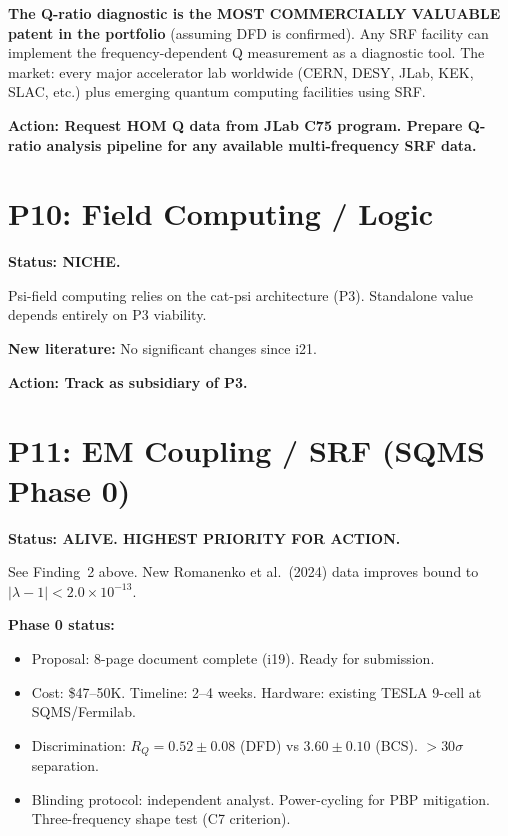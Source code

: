 \documentclass[11pt]{article}
\newcommand{\ee}[1]{\times 10^{#1}}
\begin{document}
\textbf{The Q-ratio diagnostic is the MOST COMMERCIALLY VALUABLE patent
in the portfolio} (assuming DFD is confirmed).  Any SRF facility can
implement the frequency-dependent Q measurement as a diagnostic tool.
The market: every major accelerator lab worldwide (CERN, DESY, JLab,
KEK, SLAC, etc.) plus emerging quantum computing facilities using SRF.

\textbf{Action: Request HOM Q data from JLab C75 program.  Prepare
  Q-ratio analysis pipeline for any available multi-frequency SRF data.}


\section{P10: Field Computing / Logic}

\textbf{Status: NICHE.}

Psi-field computing relies on the cat-psi architecture (P3).
Standalone value depends entirely on P3 viability.

\textbf{New literature:}  No significant changes since i21.

\textbf{Action: Track as subsidiary of P3.}


\section{P11: EM Coupling / SRF (SQMS Phase 0)}

\textbf{Status: ALIVE.  HIGHEST PRIORITY FOR ACTION.}

See Finding~2 above.  New Romanenko et al.\ (2024) data improves bound
to $|\lambda-1| < 2.0\ee{-13}$.

\textbf{Phase 0 status:}
\begin{itemize}
\item Proposal: 8-page document complete (i19).  Ready for submission.
\item Cost: \$47--50K.  Timeline: 2--4 weeks.  Hardware: existing
  TESLA 9-cell at SQMS/Fermilab.
\item Discrimination: $R_Q = 0.52 \pm 0.08$ (DFD) vs $3.60 \pm 0.10$
  (BCS).  $>30\sigma$ separation.
\item Blinding protocol: independent analyst.  Power-cycling for PBP
  mitigation.  Three-frequency shape test (C7 criterion).
\end{itemize}
\end{document}
